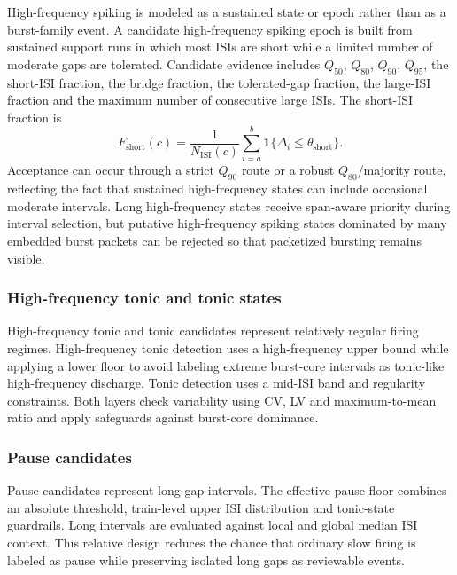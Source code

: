 \documentclass[pdflatex,sn-apa]{sn-jnl}
\newcommand{\isi}{\mathrm{ISI}}
\begin{document}
High-frequency spiking is modeled as a sustained state or epoch rather than as a burst-family event. A candidate high-frequency spiking epoch is built from sustained support runs in which most ISIs are short while a limited number of moderate gaps are tolerated. Candidate evidence includes $Q_{50}$, $Q_{80}$, $Q_{90}$, $Q_{95}$, the short-ISI fraction, the bridge fraction, the tolerated-gap fraction, the large-ISI fraction and the maximum number of consecutive large ISIs. The short-ISI fraction is
\begin{equation}
    F_{\mathrm{short}}(c)=
    \frac{1}{N_{\isi}(c)}
    \sum_{i=a}^{b}
    \mathbf{1}\{\Delta_i \le \theta_{\mathrm{short}}\}.
\end{equation}
Acceptance can occur through a strict $Q_{90}$ route or a robust $Q_{80}$/majority route, reflecting the fact that sustained high-frequency states can include occasional moderate intervals. Long high-frequency states receive span-aware priority during interval selection, but putative high-frequency spiking states dominated by many embedded burst packets can be rejected so that packetized bursting remains visible.

\subsubsection{High-frequency tonic and tonic states}

High-frequency tonic and tonic candidates represent relatively regular firing regimes. High-frequency tonic detection uses a high-frequency upper bound while applying a lower floor to avoid labeling extreme burst-core intervals as tonic-like high-frequency discharge. Tonic detection uses a mid-ISI band and regularity constraints. Both layers check variability using CV, LV and maximum-to-mean ratio and apply safeguards against burst-core dominance.

\subsubsection{Pause candidates}

Pause candidates represent long-gap intervals. The effective pause floor combines an absolute threshold, train-level upper ISI distribution and tonic-state guardrails. Long intervals are evaluated against local and global median ISI context. This relative design reduces the chance that ordinary slow firing is labeled as pause while preserving isolated long gaps as reviewable events.
\end{document}
